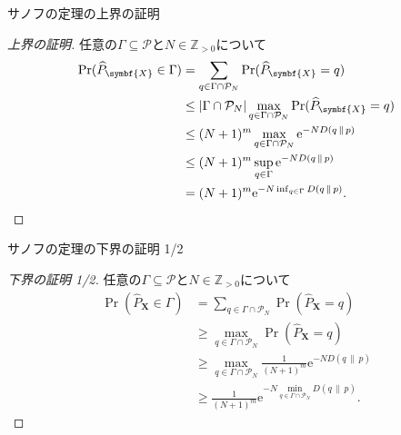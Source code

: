 \documentclass[lualatex,handout]{beamer}
\newcommand\KL[2]{D\left(#1\,\|\,#2\right)}
\theoremstyle{definition}
\begin{document}
\begin{frame}{サノフの定理の上界の証明}
\footnotesize
\sanov
\begin{proof}[\small 上界の証明]
任意の$\Gamma\subseteq\mathcal{P}$と$N\in\mathbb{Z}_{>0}$について
\begin{align*}
\Pr(\widehat{P}_{\symbf{X}}\in\Gamma) &= \sum_{q\in\Gamma\cap\mathcal{P}_N} \Pr(\widehat{P}_{\symbf{X}} = q)\\
 &\le |\Gamma\cap\mathcal{P}_N| \max_{q\in\Gamma\cap\mathcal{P}_N}\Pr(\widehat{P}_{\symbf{X}} = q)\\
 &\le (N+1)^m \max_{q\in\Gamma\cap\mathcal{P}_N}\mathrm{e}^{-N\KL{q}{p}}\\
 &\le (N+1)^m \sup_{q\in\Gamma}\mathrm{e}^{-N\KL{q}{p}}\\
 &= (N+1)^m \mathrm{e}^{-N\inf_{q\in\Gamma}\KL{q}{p}}.\qedhere
\end{align*}
\end{proof}
\end{frame}


\begin{frame}{サノフの定理の下界の証明 1/2}
\footnotesize
\sanov
\begin{proof}[\small 下界の証明 1/2]
任意の$\Gamma\subseteq\mathcal{P}$と$N\in\mathbb{Z}_{>0}$について
\begin{align*}
\Pr(\widehat{P}_{\symbf{X}}\in\Gamma) &= \sum_{q\in\Gamma\cap\mathcal{P}_N} \Pr(\widehat{P}_{\symbf{X}} = q)\\
 &\ge \max_{q\in\Gamma\cap\mathcal{P}_N}\Pr(\widehat{P}_{\symbf{X}} = q)\\
 &\ge \max_{q\in\Gamma\cap\mathcal{P}_N}\frac1{(N+1)^m}\mathrm{e}^{-N\KL{q}{p}}\\
 &\ge \frac1{(N+1)^m}\mathrm{e}^{-N\min_{q\in\Gamma\cap\mathcal{P}_N}\KL{q}{p}}.
\end{align*}
\end{proof}
\end{frame}
\end{document}
